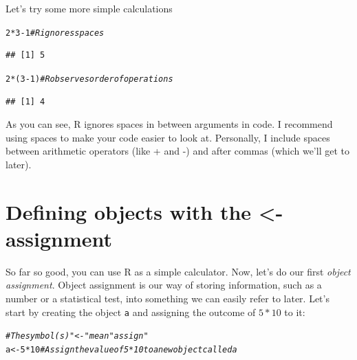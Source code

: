 \documentclass{tufte-book}\usepackage[]{graphicx}\usepackage[]{color}
\makeatletter
\newcommand{\hlnum}[1]{\textcolor[rgb]{0.686,0.059,0.569}{#1}}%
\newcommand{\hlcom}[1]{\textcolor[rgb]{0.678,0.584,0.686}{\textit{#1}}}%
\newcommand{\hlopt}[1]{\textcolor[rgb]{0,0,0}{#1}}%
\newcommand{\hlstd}[1]{\textcolor[rgb]{0.345,0.345,0.345}{#1}}%
\newcommand{\hlkwb}[1]{\textcolor[rgb]{0.69,0.353,0.396}{#1}}%
\newenvironment{kframe}{%
 \def\at@end@of@kframe{}%
 \ifinner\ifhmode%
  \def\at@end@of@kframe{\end{minipage}}%
  \begin{minipage}{\columnwidth}%
 \fi\fi%
 \def\FrameCommand##1{\hskip\@totalleftmargin \hskip-\fboxsep
 \colorbox{shadecolor}{##1}\hskip-\fboxsep
     \hskip-\linewidth \hskip-\@totalleftmargin \hskip\columnwidth}%
 \MakeFramed {\advance\hsize-\width
   \@totalleftmargin\z@ \linewidth\hsize
   \@setminipage}}%
 {\par\unskip\endMakeFramed%
 \at@end@of@kframe}
\newenvironment{knitrout}{}{} %
\makeatother
\begin{document}
Let's try some more simple calculations


\begin{knitrout}
\color{fgcolor}\begin{kframe}
\begin{alltt}
\hlnum{2} \hlopt{*} \hlnum{3} \hlopt{-} \hlnum{1} \hlcom{# R ignores spaces}
\end{alltt}
\begin{verbatim}
## [1] 5
\end{verbatim}
\begin{alltt}
\hlnum{2} \hlopt{*} \hlstd{(}\hlnum{3} \hlopt{-} \hlnum{1}\hlstd{)} \hlcom{# R observes order of operations}
\end{alltt}
\begin{verbatim}
## [1] 4
\end{verbatim}
\end{kframe}
\end{knitrout}


As you can see, R ignores spaces in between arguments in code. I recommend using spaces to make your code easier to look at. Personally, I include spaces between arithmetic operators (like + and -) and after commas (which we'll get to later).

\section{Defining objects with the <- assignment}


So far so good, you can use R as a simple calculator. Now, let's do our first \textit{object assignment}. Object assignment is our way of storing information, such as a number or a statistical test, into something we can easily refer to later. Let's start by creating the object \texttt{a} and assigning the outcome of $5*10$ to it:


\begin{knitrout}
\color{fgcolor}\begin{kframe}
\begin{alltt}
\hlcom{# The symbol(s) "<-" mean "assign"}
\hlstd{a} \hlkwb{<-} \hlnum{5} \hlopt{*} \hlnum{10} \hlcom{# Assign the value of 5*10 to a new object called a}
\end{alltt}
\end{kframe}
\end{knitrout}
\end{document}

